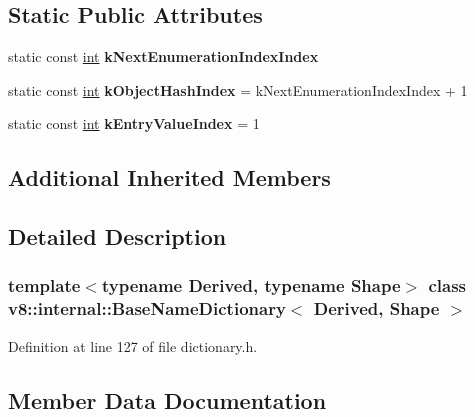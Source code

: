 \subsection*{Static Public Attributes}
\begin{DoxyCompactItemize}
\item 
static const \mbox{\hyperlink{classint}{int}} {\bfseries k\+Next\+Enumeration\+Index\+Index}
\item 
\mbox{\label{classv8_1_1internal_1_1BaseNameDictionary_a4ed62b4b2ec071e8e77f977038701b38}} 
static const \mbox{\hyperlink{classint}{int}} {\bfseries k\+Object\+Hash\+Index} = k\+Next\+Enumeration\+Index\+Index + 1
\item 
\mbox{\label{classv8_1_1internal_1_1BaseNameDictionary_a71b40941c0556ab8a39e1b67f69341c9}} 
static const \mbox{\hyperlink{classint}{int}} {\bfseries k\+Entry\+Value\+Index} = 1
\end{DoxyCompactItemize}
\subsection*{Additional Inherited Members}


\subsection{Detailed Description}
\subsubsection*{template$<$typename Derived, typename Shape$>$\newline
class v8\+::internal\+::\+Base\+Name\+Dictionary$<$ Derived, Shape $>$}



Definition at line 127 of file dictionary.\+h.



\subsection{Member Data Documentation}
\mbox{\label{classv8_1_1internal_1_1BaseNameDictionary_a0e121ae75d3c3403b89ccfa53c0204b1}} 
